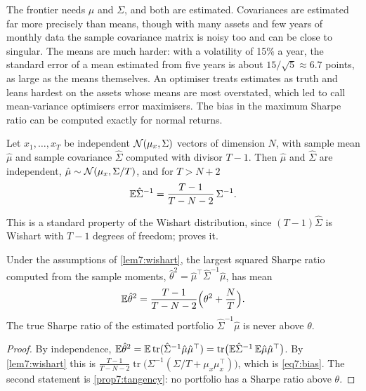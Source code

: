 \begin{chapterrefs}
The frontier needs $\mu$ and $\Sigma$, and both are estimated. Covariances are estimated far more
precisely than means, though with many assets and few years of monthly data the sample covariance
matrix is noisy too and can be close to singular. The means are much harder: with a volatility of 15\% a year, the
standard error of a mean estimated from five years is about $15/\sqrt5\approx6.7$ points, as large as
the means themselves. An optimiser treats estimates as truth and leans hardest on the assets whose
means are most overstated, which led \textcite{michaud1989} to call mean-variance optimisers error
maximisers. The bias in the maximum Sharpe ratio can be computed exactly for normal returns.

\begin{lemma}\label{lem7:wishart}
Let $x_1,\dots,x_T$ be independent $\mathcal{N}(\mu_x,\Sigma)$ vectors of dimension $N$, with sample mean
$\hat\mu$ and sample covariance $\hat\Sigma$ computed with divisor $T-1$. Then $\hat\mu$ and $\hat\Sigma$
are independent, $\hat\mu\sim\mathcal{N}(\mu_x,\Sigma/T)$, and for $T>N+2$
\begin{equation}\label{eq7:wishart}
  \mathbb{E}\hat\Sigma^{-1}=\frac{T-1}{T-N-2}\,\Sigma^{-1} .
\end{equation}
\end{lemma}

This is a standard property of the Wishart distribution, since $(T-1)\hat\Sigma$ is Wishart with
$T-1$ degrees of freedom; \textcite{muirhead1982} proves it.

\begin{proposition}\label{prop7:bias}
Under the assumptions of \cref{lem7:wishart}, the largest squared Sharpe ratio computed from the sample
moments, $\hat\theta^2=\hat\mu^\top\hat\Sigma^{-1}\hat\mu$, has mean
\begin{equation}\label{eq7:bias}
  \mathbb{E}\hat\theta^2=\frac{T-1}{T-N-2}\Bigl(\theta^2+\frac NT\Bigr).
\end{equation}
The true Sharpe ratio of the estimated portfolio $\hat\Sigma^{-1}\hat\mu$ is never above $\theta$.
\end{proposition}

\begin{proof}
By independence, $\mathbb{E}\hat\theta^2=\mathbb{E}\operatorname{tr}(\hat\Sigma^{-1}\hat\mu\hat\mu^\top)=\operatorname{tr}\bigl(\mathbb{E}\hat\Sigma^{-1}\,\mathbb{E}\hat\mu\hat\mu^\top\bigr)$.
By \cref{lem7:wishart} this is $\frac{T-1}{T-N-2}\operatorname{tr}\bigl(\Sigma^{-1}(\Sigma/T+\mu_x\mu_x^\top)\bigr)$,
which is \cref{eq7:bias}. The second statement is \cref{prop7:tangency}: no portfolio has a Sharpe ratio
above $\theta$.
\end{proof}


\end{chapterrefs}
